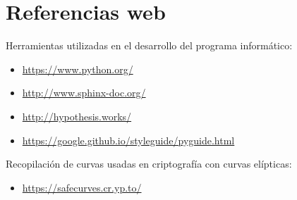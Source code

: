 


\manualmark
\markboth{\spacedlowsmallcaps{\bibname}}{\spacedlowsmallcaps{\bibname}} %
{}
\label{app:bibliography}

\printbibliography


\cleardoublepage

\chapter*{Referencias web}


Herramientas utilizadas en el desarrollo del programa informático:

\begin{itemize}
    \item \url{https://www.python.org/}
    \item \url{http://www.sphinx-doc.org/}
    \item \url{http://hypothesis.works/}
    \item \url{https://google.github.io/styleguide/pyguide.html}
\end{itemize}

Recopilación de curvas usadas en criptografía con curvas elípticas:

\begin{itemize}
    \item \url{https://safecurves.cr.yp.to/}
\end{itemize}
